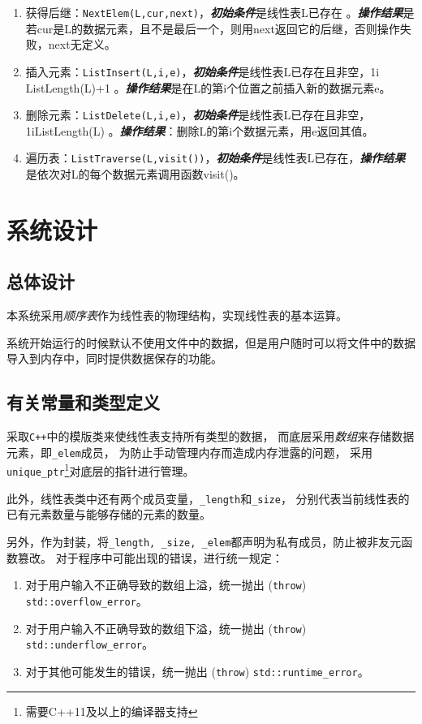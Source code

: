 \begin{enumerate}
\item 获得后继：\texttt{NextElem(L,cur,next)}，\newline \textbf{\emph{初始条件}}是线性表L已存在 。\newline \textbf{\emph{操作结果}}是若cur是L的数据元素，且不是最后一个，则用next返回它的后继，否则操作失败，next无定义。
\item 插入元素：\texttt{ListInsert(L,i,e)}，\newline \textbf{\emph{初始条件}}是线性表L已存在且非空，1\le i \le ListLength(L)+1 。\newline \textbf{\emph{操作结果}}是在L的第i个位置之前插入新的数据元素e。
\item 删除元素：\texttt{ListDelete(L,i,e)}，\newline \textbf{\emph{初始条件}}是线性表L已存在且非空，1\le i\le ListLength(L) 。\newline \textbf{\emph{操作结果}}：删除L的第i个数据元素，用e返回其值。
\item 遍历表：\texttt{ListTraverse(L,visit())}，\newline \textbf{\emph{初始条件}}是线性表L已存在，\newline \textbf{\emph{操作结果}}是依次对L的每个数据元素调用函数visit()。
\end{enumerate}
\section{系统设计}
\subsection{总体设计}
本系统采用\emph{顺序表}作为线性表的物理结构，实现线性表的基本运算。
\par
系统开始运行的时候默认不使用文件中的数据，但是用户随时可以将文件中的数据导入到内存中，同时提供数据保存的功能。
\subsection{有关常量和类型定义}
采取\texttt{C++}中的模版类来使线性表支持所有类型的数据，
而底层采用\emph{数组}来存储数据元素，即\texttt{\_elem}成员，
为防止手动管理内存而造成内存泄露的问题，
采用\texttt{unique\_ptr}\footnote{需要C++11及以上的编译器支持}对底层的指针进行管理。
\par
此外，线性表类中还有两个成员变量，\texttt{\_length}和\texttt{\_size}，
分别代表当前线性表的已有元素数量与能够存储的元素的数量。
\par
另外，作为封装，将\texttt{\_length, \_size, \_elem}都声明为私有成员，防止被非友元函数篡改。
对于程序中可能出现的错误，进行统一规定：
\begin{enumerate}
    \item 对于用户输入不正确导致的数组上溢，统一抛出 (\texttt{throw}) \texttt{std::overflow\_error}。
    \item 对于用户输入不正确导致的数组下溢，统一抛出 (\texttt{throw}) \texttt{std::underflow\_error}。
    \item 对于其他可能发生的错误，统一抛出 (\texttt{throw}) \texttt{std::runtime\_error}。
\end{enumerate}
